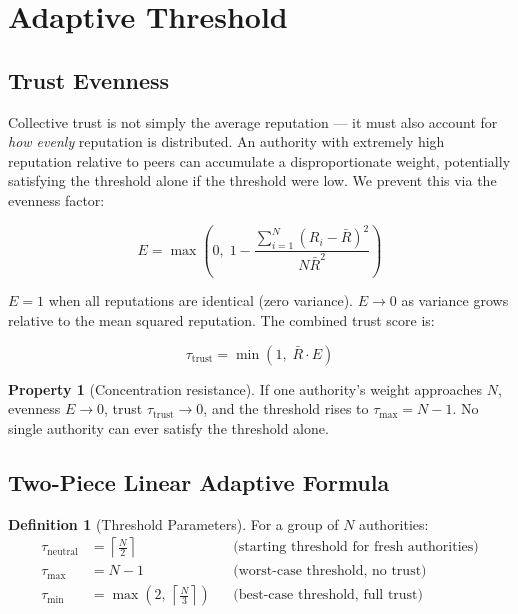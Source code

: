 \documentclass[12pt,a4paper]{article}
\theoremstyle{definition}
\newtheorem{definition}{Definition}[section]
\newtheorem{property}{Property}[section]
\theoremstyle{remark}
\begin{document}
\section{Adaptive Threshold}
\label{sec:threshold}

\subsection{Trust Evenness}

Collective trust is not simply the average reputation — it must also account
for \emph{how evenly} reputation is distributed.
An authority with extremely high reputation relative to peers can accumulate
a disproportionate weight, potentially satisfying the threshold alone if the
threshold were low.
We prevent this via the evenness factor:

\begin{equation}
  E = \max\!\left(0,\; 1 - \frac{\displaystyle\sum_{i=1}^{N}(R_i - \bar{R})^2}
                                  {N \bar{R}^2}\right)
  \label{eq:evenness}
\end{equation}

$E = 1$ when all reputations are identical (zero variance).
$E \to 0$ as variance grows relative to the mean squared reputation.
The combined trust score is:

\begin{equation}
  \tau_{\text{trust}} = \min\!\left(1,\; \bar{R} \cdot E\right)
  \label{eq:trust}
\end{equation}

\begin{property}[Concentration resistance]
\label{prop:concentration}
  If one authority's weight approaches $N$, evenness $E \to 0$,
  trust $\tau_{\text{trust}} \to 0$, and the threshold rises to
  $\tau_{\text{max}} = N-1$.
  No single authority can ever satisfy the threshold alone.
\end{property}

\subsection{Two-Piece Linear Adaptive Formula}

\begin{definition}[Threshold Parameters]
  For a group of $N$ authorities:
  \begin{align}
    \tau_{\text{neutral}} &= \left\lceil \tfrac{N}{2} \right\rceil
      & &\text{(starting threshold for fresh authorities)} \\
    \tau_{\text{max}}     &= N - 1
      & &\text{(worst-case threshold, no trust)} \\
    \tau_{\text{min}}     &= \max\!\left(2,\, \left\lceil \tfrac{N}{3} \right\rceil\right)
      & &\text{(best-case threshold, full trust)}
  \end{align}
\end{definition}
\end{document}
